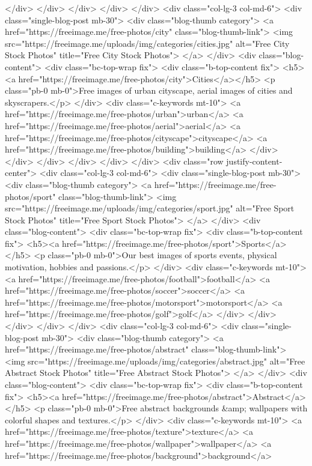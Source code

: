 </div>
</div>
</div>
</div>
</div>
<div class="col-lg-3 col-md-6">
<div class="single-blog-post mb-30">
<div class="blog-thumb category">
<a href="https://freeimage.me/free-photos/city" class="blog-thumb-link">
<img src="https://freeimage.me/uploads/img/categories/cities.jpg" alt="Free City Stock Photos" title="Free City Stock Photos">
</a>
</div>
<div class="blog-content">
<div class="bc-top-wrap fix">
<div class="b-top-content fix">
<h5><a href="https://freeimage.me/free-photos/city">Cities</a></h5>
<p class="pb-0 mb-0">Free images of urban cityscape, aerial images of cities and skyscrapers.</p>
</div>
<div class="c-keywords mt-10">
<a href="https://freeimage.me/free-photos/urban">urban</a> <a href="https://freeimage.me/free-photos/aerial">aerial</a> <a href="https://freeimage.me/free-photos/cityscape">cityscape</a> <a href="https://freeimage.me/free-photos/building">building</a>
</div>
</div>
</div>
</div>
</div>
</div>
<div class="row justify-content-center">
<div class="col-lg-3 col-md-6">
<div class="single-blog-post mb-30">
<div class="blog-thumb category">
<a href="https://freeimage.me/free-photos/sport" class="blog-thumb-link">
<img src="https://freeimage.me/uploads/img/categories/sport.jpg" alt="Free Sport Stock Photos" title="Free Sport Stock Photos">
</a>
</div>
<div class="blog-content">
<div class="bc-top-wrap fix">
<div class="b-top-content fix">
<h5><a href="https://freeimage.me/free-photos/sport">Sports</a></h5>
<p class="pb-0 mb-0">Our best images of sports events, physical motivation, hobbies and passions.</p>
</div>
<div class="c-keywords mt-10">
<a href="https://freeimage.me/free-photos/football">football</a> <a href="https://freeimage.me/free-photos/soccer">soccer</a> <a href="https://freeimage.me/free-photos/motorsport">motorsport</a> <a href="https://freeimage.me/free-photos/golf">golf</a>
</div>
</div>
</div>
</div>
</div>
<div class="col-lg-3 col-md-6">
<div class="single-blog-post mb-30">
<div class="blog-thumb category">
<a href="https://freeimage.me/free-photos/abstract" class="blog-thumb-link">
<img src="https://freeimage.me/uploads/img/categories/abstract.jpg" alt="Free Abstract Stock Photos" title="Free Abstract Stock Photos">
</a>
</div>
<div class="blog-content">
<div class="bc-top-wrap fix">
<div class="b-top-content fix">
<h5><a href="https://freeimage.me/free-photos/abstract">Abstract</a></h5>
<p class="pb-0 mb-0">Free abstract backgrounds &amp; wallpapers with colorful shapes and textures.</p>
</div>
<div class="c-keywords mt-10">
<a href="https://freeimage.me/free-photos/texture">texture</a> <a href="https://freeimage.me/free-photos/wallpaper">wallpaper</a> <a href="https://freeimage.me/free-photos/background">background</a>
